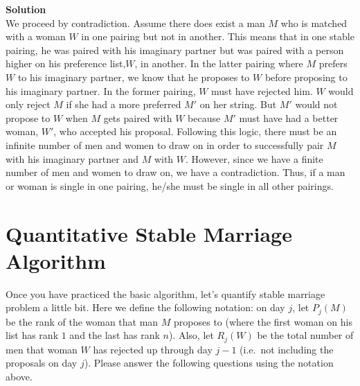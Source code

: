 \documentclass[11pt]{article}
\newcommand*{\Question}[1]{\section{#1}}
\newenvironment{Parts}{\begin{enumerate}[label=(\alph*)]}{\end{enumerate}}
\newenvironment{Answer}{\vspace{10pt}\begin{mdframed}\textbf{Solution}\\}{\end{mdframed}\vfill\pagebreak[3]}
\newenvironment{Answer}{\vspace{10pt}}{\vfill\pagebreak[3]}
\begin{document}
\begin{Parts}
\begin{Answer}
    We proceed by contradiction. Assume there does exist a man $M$ who is matched with a woman $W$ in one pairing but not in another. This means that in one stable pairing, he was paired with his imaginary partner but was paired with a person higher on his preference list,$W$, in another. In the latter pairing where $M$ prefers $W$ to his imaginary partner, we know that he proposes to $W$ before proposing to his imaginary partner. In the former pairing, $W$ must have rejected him. $W$ would only reject $M$ if she had a more preferred $M'$ on her string. But $M'$ would not propose to $W$ when $M$ gets paired with $W$ because $M'$ must have had a better woman, $W'$, who accepted his proposal. Following this logic, there must be an infinite number of men and women to draw on in order to successfully pair $M$ with his imaginary partner and $M$ with $W$. However, since we have a finite number of men and women to draw on, we have a contradiction. Thus, if a man or woman is single in one pairing, he/she must be single in all other pairings.
\end{Answer}

\end{Parts}

\Question{Quantitative Stable Marriage Algorithm}

Once you have practiced the basic algorithm, let's quantify stable marriage problem a little bit. Here we define the following notation: on day $j$, let $P_j(M)$ be the rank of the woman that man $M$ proposes to (where the first woman on his list has rank $1$ and the last has rank $n$). Also, let $R_j(W)$ be the total number of men that woman $W$ has rejected up through day $j-1$ (i.e.\ not including the proposals on day $j$). Please answer the following questions using the notation above.
\end{document}
